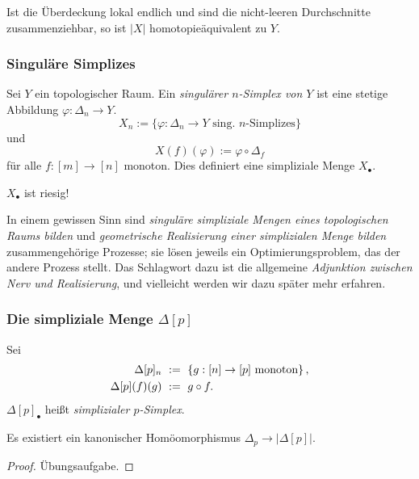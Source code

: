\begin{bemerkung}
  Ist die Überdeckung lokal endlich und sind die nicht-leeren Durchschnitte
  zusammenziehbar, so ist $|X|$ homotopieäquivalent zu $Y$.
\end{bemerkung}


\subsubsection{Singuläre Simplizes}

\begin{definition}
  Sei $Y$ ein topologischer Raum. Ein \emph{singulärer $n$-Simplex von $Y$}
  ist eine stetige Abbildung $\varphi:\Delta_n \to Y$.
  \[ X_n := \{\varphi:\Delta_n \to Y\text{ sing. $n$-Simplizes}\}\]
  und
  \[ X(f)(\varphi) := \varphi\circ \Delta_f\]
  für alle $f:[m] \to [n]$ monoton. Dies definiert eine simpliziale Menge
  $X_\bullet$.
\end{definition}

\begin{bemerkung}
  $X_\bullet$ ist riesig!
\end{bemerkung}

\begin{bemerkung}
  In einem gewissen Sinn sind \emph{singuläre simpliziale Mengen eines
  topologischen Raums bilden} und \emph{geometrische Realisierung einer
  simplizialen Menge bilden} zusammengehörige Prozesse; sie lösen jeweils ein
  Optimierungsproblem, das der andere Prozess stellt. Das Schlagwort dazu ist
  die allgemeine \emph{Adjunktion zwischen Nerv und Realisierung}, und
  vielleicht werden wir dazu später mehr erfahren.
\end{bemerkung}

\subsubsection{Die simpliziale Menge $\Delta[p]$}

\begin{definition}
  Sei
  \begin{align*}
    \Delta[p]_n \ &:=\  \{ g: [n]\to [p] \text{ monoton}\}\,, \\
    \Delta[p](f)(g) \ &:=\  g\circ f.
  \end{align*}
  $\Delta[p]_\bullet$ heißt \emph{simplizialer $p$-Simplex}.
\end{definition}

\begin{lemma}
  Es existiert ein kanonischer Homöomorphismus $\Delta_p \to |\Delta[p]|$.
\end{lemma}
\begin{proof}
  Übungsaufgabe.
\end{proof}



